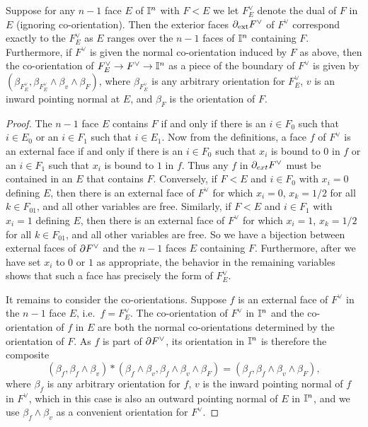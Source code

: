 \begin{lemma}\label{L: ext faces}
Suppose for any $n-1$ face $E$ of $\mathbb{I}^n$ with $F<E$ we let $F_E^\vee$ denote the dual of $F$ in $E$ (ignoring co-orientation). Then the exterior faces $\partial_{\text{ext}}F^\vee$ of $F^\vee$ correspond exactly to the $F_E^\vee$ as $E$ ranges over the $n-1$ faces of $\mathbb{I}^n$ containing $F$. Furthermore, if $F^\vee$ is given the normal co-orientation induced by $F$ as above, then the co-orientation of $F^\vee_E \to F^\vee \to \mathbb{I}^n$ as a piece of the boundary of $F^\vee$ is given by $(\beta_{F_E^\vee},\beta_{F_E^\vee}\wedge\beta_v \wedge \beta_F)$, where $\beta_{F_E^\vee}$ is any arbitrary orientation for $F_E^\vee$, $v$ is an inward pointing normal at $E$, and $\beta_F$ is the orientation of $F$.
\end{lemma}
\begin{proof}
The $n-1$ face $E$ contains $F$ if and only if there is an $i \in F_0$ such that $i \in E_0$ or an $i \in F_1$ such that $i \in E_1$. Now from the definitions, a face $f$ of $F^\vee$ is an external face if and only if there is an $i \in F_0$ such that $x_i$ is bound to $0$ in $f$ or an $i \in F_1$ such that $x_i$ is bound to $1$ in $f$. Thus any $f$ in $\partial_{ext}F^\vee$ must be contained in an $E$ that contains $F$. Conversely, if $F<E$ and $i \in F_0$ with $x_i = 0$ defining $E$, then there is an external face of $F^\vee$ for which $x_i = 0$, $x_k = 1/2$ for all $k \in F_{01}$, and all other variables are free. Similarly, if $F<E$ and $i \in F_1$ with $x_i = 1$ defining $E$, then there is an external face of $F^\vee$ for which $x_i = 1$, $x_k = 1/2$ for all $k \in F_{01}$, and all other variables are free. So we have a bijection between external faces of $\partial F^\vee$ and the $n-1$ faces $E$ containing $F$. Furthermore, after we have set $x_i$ to $0$ or $1$ as appropriate, the behavior in the remaining variables shows that such a face has precisely the form of $F^\vee_E$.

It remains to consider the co-orientations. Suppose $f$ is an external face of $F^\vee$ in the $n-1$ face $E$, i.e.\ $f = F^\vee_E$. The co-orientation of $F^\vee$ in $\mathbb{I}^n$ and the co-orientation of $f$ in $E$ are both the normal co-orientations determined by the orientation of $F$. As $f$ is part of $\partial F^\vee$, its orientation in $\mathbb{I}^n$ is therefore the composite $$(\beta_f,\beta_f\wedge\beta_v)*(\beta_f\wedge\beta_v,\beta_f\wedge\beta_v \wedge \beta_F) = (\beta_f,\beta_f\wedge\beta_v \wedge \beta_F),$$ where $\beta_f$ is any arbitrary orientation for $f$, $v$ is the inward pointing normal of $f$ in $F^\vee$, which in this case is also an outward pointing normal of $E$ in $\mathbb{I}^n$, and we use $\beta_f\wedge\beta_v$ as a convenient orientation for $F^\vee$.
\end{proof}

